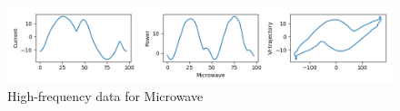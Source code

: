 \begin{figure} 
	\centering
	\includegraphics[width=1\linewidth]{images/microwave40A1}
	\caption[High-frequency data for Microwave]{High-frequency data for Microwave}
	\label{fig:microwave40A1}
\end{figure}

